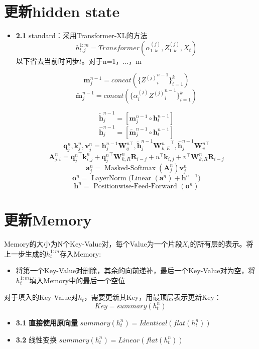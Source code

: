 \documentclass{article}
\begin{document}
\section{更新hidden state}
	\begin{itemize}
		\item \textbf{2.1} standard：采用Transformer-XL的方法
			$$h_{t,j}^{1:m} = Transformer(\alpha_{1:k}^{(j)},Z_{1:k}^{(j)}, X_t)$$ 
			以下省去当前时间步$t$。对于n=1，...，m
			
	$$\textbf{m}_{j}^{n-1} = concat(\{{Z^{(j)}}_i^{n-1}\}_{i=1}^k)$$
	$$\tilde{\textbf{m}}_{j}^{n-1} = concat(\{\alpha_i^{(j)}{Z^{(j)}}_i^{n-1}\}_{i=1}^k) $$
			
$$\tilde{\mathbf{h}}_{j}^{n-1}=\left[\mathbf{m}_{j}^{n-1}\circ \mathbf{h}_{t}^{n-1}\right]$$
$$\hat{\mathbf{h}}_{j}^{n-1}=\left[\tilde{\mathbf{m}}_{j}^{n-1} \circ \mathbf{h}_{t}^{n-1}\right]$$
$$\mathbf{q}_{j}^{n}, \mathbf{k}_{j}^{n}, \mathbf{v}_{j}^{n}=\mathbf{h}_{j}^{n-1} \mathbf{W}_{q}^{n \top}, \tilde{\mathbf{h}}_{j}^{n-1} {\mathbf{W}_{k, E}^{n}}^{\top}, \hat{\mathbf{h}}_{j}^{n-1} \mathbf{W}_{v}^{n \top}$$
$$\mathbf{A}_{j, i}^{n}={\mathbf{q}_{j}^{n}}^{\top} \mathbf{k}_{i, j}^{n}+{\mathbf{q}_{j}^{n}}^{\top} \mathbf{W}_{k, R}^{n} \mathbf{R}_{i-j}+u^{\top} \mathbf{k}_{i, j}+v^{\top} \mathbf{W}_{k, R}^{n} \mathbf{R}_{i-j}$$
$$\mathbf{a}_{j}^{n}=\operatorname{Masked-Softmax}\left(\mathbf{A}_{j}^{n}\right) \mathbf{v}_{j}^{n}$$
$$\mathbf{o}^{n}=\text { LayerNorm (Linear }\left(\mathbf{a}^{n}\right)+\mathbf{h}^{n-1} )$$
$$\mathbf{h}^{n}=\text { Positionwise-Feed-Forward }\left(\mathbf{o}^{n}\right)$$


	\end{itemize}
\section{更新Memory}
	Memory的大小为N个Key-Value对，每个Value为一个片段$X_i$的所有层的表示。将上一步生成的$h_t^{1:m}$存入Memory:
	\begin{itemize}
		\item 将第一个Key-Value对删除，其余的向前递补，最后一个Key-Value对为空，将$h_t^{1:m}$填入Memory中的最后一个空位
	\end{itemize}
	对于填入的Key-Value对$h_t$，需要更新其Key，用最顶层表示更新Key：
	$$Key = summary(h_t^n)$$
	\begin{itemize}
		\item \textbf{3.1} \textbf{直接使用原向量} $summary(h_t^n) = Identical(flat(h_t^n))$
		\item \textbf{3.2} 线性变换 $summary(h_t^n) = Linear(flat(h_t^n))$
	\end{itemize}


\end{document}

